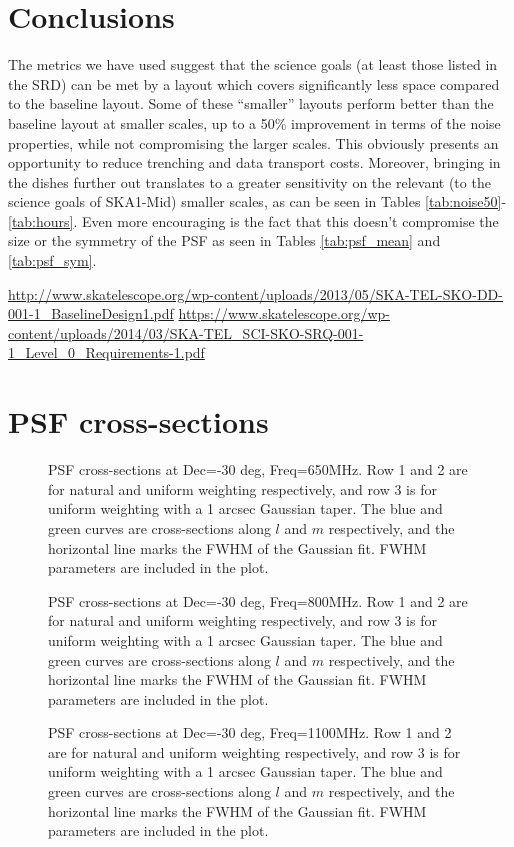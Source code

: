 \documentclass[sfheadings,a4paper,10pt,floats,floatfix]{article}
\begin{document}
\section{Conclusions}\label{sec:conclusion}
The metrics we have used suggest that the science goals (at least those listed in the SRD) can be met by a layout which
covers significantly less space compared to the baseline layout. Some of these ``smaller'' layouts perform better than the
baseline layout at smaller scales, up to a 50\% improvement in terms of the noise properties, while not compromising the larger
scales. This obviously presents an opportunity to reduce trenching and data transport costs. Moreover, bringing in the dishes
further out translates to a greater sensitivity on the relevant (to the science goals of SKA1-Mid) smaller scales, as can be seen
in Tables \ref{tab:noise50}-\ref{tab:hours}. Even more encouraging is the fact that this doesn't compromise the size or the
symmetry of the PSF as seen in Tables \ref{tab:psf_mean} and \ref{tab:psf_sym}.
\begin{thebibliography}{99}
  \url{http://www.skatelescope.org/wp-content/uploads/2013/05/SKA-TEL-SKO-DD-001-1_BaselineDesign1.pdf}
  \url{https://www.skatelescope.org/wp-content/uploads/2014/03/SKA-TEL_SCI-SKO-SRQ-001-1_Level_0_Requirements-1.pdf}
\end{thebibliography}
\appendix
\section{PSF cross-sections}\label{app:psf}
\begin{figure}[H]
 \tiny{}
 \caption{PSF cross-sections at Dec=-30 deg, Freq=650MHz. Row 1 and 2 are for natural and uniform weighting respectively, and row
3 is for uniform weighting with a 1 arcsec Gaussian taper. The blue and green curves are cross-sections along $l$ and $m$
respectively, and the horizontal line marks the FWHM of the Gaussian fit. FWHM parameters are included in the plot.}
\end{figure}
\begin{figure}[H]
 \tiny{}
 \caption{PSF cross-sections at Dec=-30 deg, Freq=800MHz. Row 1 and 2 are for natural and uniform weighting respectively, and  row
3 is for uniform weighting with a 1 arcsec Gaussian taper. The blue and green curves are cross-sections along $l$ and $m$
respectively, and the horizontal line marks the FWHM of the Gaussian fit. FWHM parameters are included in the plot.}
\end{figure}
\begin{figure}[H]
 \tiny{}
 \caption{PSF cross-sections at Dec=-30 deg, Freq=1100MHz. Row 1 and 2 are for natural and uniform weighting respectively, and row
3 is for uniform weighting with a 1 arcsec Gaussian taper. The blue and green curves are cross-sections along $l$ and $m$
respectively, and the horizontal line marks the FWHM of the Gaussian fit. FWHM parameters are included in the plot.}
\end{figure}
\end{document}
